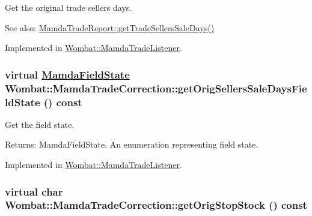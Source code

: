 Get the original trade sellers days. 

\begin{Desc}
\item[See also:]\hyperlink{classWombat_1_1MamdaTradeReport_c9ed0e49599c96128f6be2a1e3390a33}{Mamda\-Trade\-Report::get\-Trade\-Sellers\-Sale\-Days()} \end{Desc}


Implemented in \hyperlink{classWombat_1_1MamdaTradeListener_7020c24d5e41e1a14734ffd8673ac860}{Wombat::Mamda\-Trade\-Listener}.\hypertarget{classWombat_1_1MamdaTradeCorrection_e0ffd31bf88ae2165d5d33f6fdcfd9e2}{
\subsubsection[getOrigSellersSaleDaysFieldState]{\setlength{\rightskip}{0pt plus 5cm}virtual \hyperlink{namespaceWombat_93aac974f2ab713554fd12a1fa3b7d2a}{Mamda\-Field\-State} Wombat::Mamda\-Trade\-Correction::get\-Orig\-Sellers\-Sale\-Days\-Field\-State () const}}
\label{classWombat_1_1MamdaTradeCorrection_e0ffd31bf88ae2165d5d33f6fdcfd9e2}


Get the field state. 

\begin{Desc}
\item[Returns:]Mamda\-Field\-State. An enumeration representing field state. \end{Desc}


Implemented in \hyperlink{classWombat_1_1MamdaTradeListener_e4e53df493af564fb26c91e1cf6f0a0e}{Wombat::Mamda\-Trade\-Listener}.\hypertarget{classWombat_1_1MamdaTradeCorrection_d4603cdb9f1824cc39be134c9f0dc49f}{
\subsubsection[getOrigStopStock]{\setlength{\rightskip}{0pt plus 5cm}virtual char Wombat::Mamda\-Trade\-Correction::get\-Orig\-Stop\-Stock () const}}
\label{classWombat_1_1MamdaTradeCorrection_d4603cdb9f1824cc39be134c9f0dc49f}


